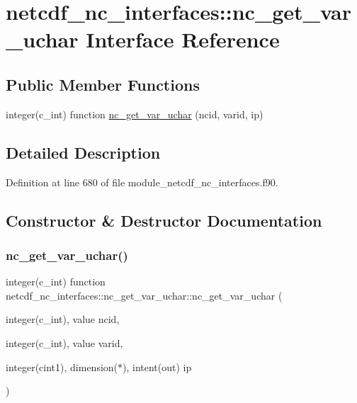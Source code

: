 \hypertarget{interfacenetcdf__nc__interfaces_1_1nc__get__var__uchar}{}\section{netcdf\+\_\+nc\+\_\+interfaces\+:\+:nc\+\_\+get\+\_\+var\+\_\+uchar Interface Reference}
\label{interfacenetcdf__nc__interfaces_1_1nc__get__var__uchar}
\subsection*{Public Member Functions}
\begin{DoxyCompactItemize}
\item 
integer(c\+\_\+int) function \hyperlink{interfacenetcdf__nc__interfaces_1_1nc__get__var__uchar_a9faa9366a1ca6fa192c32897e1ad14c0}{nc\+\_\+get\+\_\+var\+\_\+uchar} (ncid, varid, ip)
\end{DoxyCompactItemize}


\subsection{Detailed Description}


Definition at line 680 of file module\+\_\+netcdf\+\_\+nc\+\_\+interfaces.\+f90.



\subsection{Constructor \& Destructor Documentation}
\mbox{\label{interfacenetcdf__nc__interfaces_1_1nc__get__var__uchar_a9faa9366a1ca6fa192c32897e1ad14c0}} 
\subsubsection{\texorpdfstring{nc\+\_\+get\+\_\+var\+\_\+uchar()}{nc\_get\_var\_uchar()}}
{\footnotesize\ttfamily integer(c\+\_\+int) function netcdf\+\_\+nc\+\_\+interfaces\+::nc\+\_\+get\+\_\+var\+\_\+uchar\+::nc\+\_\+get\+\_\+var\+\_\+uchar (\begin{DoxyParamCaption}\item[{integer(c\+\_\+int), value}]{ncid,  }\item[{integer(c\+\_\+int), value}]{varid,  }\item[{integer(cint1), dimension($\ast$), intent(out)}]{ip }\end{DoxyParamCaption})}



